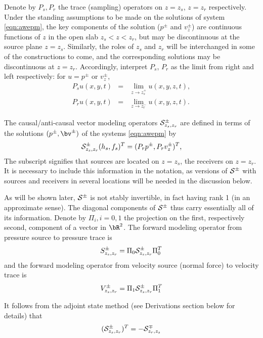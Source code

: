 Denote by $P_s,P_r$ the trace (sampling)
operators on $z=z_s$, $z=z_r$ respectively.
Under the standing assumptions to be made on
the solutions of system \ref{eqn:awepm}, the key components of the
solution ($p^{\pm}$ and $v^{\pm}_z$) are continuous functions of $z$
in the open slab $z_s<z<z_r$, but may be discontinuous at the source
plane $z=z_s$. Similarly, the roles of $z_s$ and $z_r$ will be
interchanged in some of the constructions to come, and the
corresponding solutions may be discontinuous at $z=z_r$. Accordingly,
interpret $P_s$, $P_r$ as the limit from right and left respectively:
for $u=p^{\pm}$ or $v^{\pm}_z$,
\begin{eqnarray}
  \label{eqn:defsamp}
  P_su(x,y,t) &=& \lim_{z \rightarrow z_s^+} u(x,y,z,t),\nonumber \\
  P_ru(x,y,t) &=& \lim_{z \rightarrow z_r^-} u(x,y,z,t).                  
\end{eqnarray}

The causal/anti-causal vector
modeling operators ${\cal S}^{\pm}_{z_s,z_r}$ are defined in terms of
the solutions $(p^{\pm},\bv^{\pm})$ of the systems \ref{eqn:awepm} by
\begin{equation}
  {\cal S}^{\pm}_{z_s,z_r}(h_s,f_s)^T  = (P_rp^{\pm},P_r v_z^{\pm})^T,
  \label{eqn:fwd}
\end{equation}
The subscript signifies that sources are located on $z=z_s$, the
receivers on $z=z_r$. It is necessary to include this information in
the notation, as versions of ${\cal S}^{\pm}$ with sources and receivers in
several locations will be needed in the discussion below.

As will be shown later, ${\cal S}^{\pm}$ is not stably invertible, in fact
having rank 1 (in an approximate sense). The diagonal components of
${\cal S}^{\pm}$ thus carry essentially all of its information.
Denote by $\Pi_i, i=0,1$ the projection on the first,
respectively second, component of a vector in $\bR^2$. The 
forward modeling operator from pressure source to pressure trace is
\begin{equation}
  \label{eqn:sdef}
  S^{\pm}_{z_s,z_r} = \Pi_0 {\cal S}^{\pm}_{z_s,z_r} \Pi_0^T 
\end{equation}
and the forward modeling operator from velocity source (normal force)
to velocity trace is
\begin{equation}
  \label{eqn:vdef}
  V^{\pm}_{z_s,z_r} = \Pi_1 {\cal S}^{\pm}_{z_s,z_r} \Pi_1^T 
\end{equation}


It follows from the adjoint state method (see Derivations section
below for details) that
\begin{equation}
  \label{eqn:sadj1}
  ({\cal S}^{\pm}_{z_s, z_r})^T = -{\cal S}^{\mp}_{z_r,z_s}
\end{equation}

